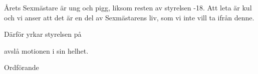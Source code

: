 \documentclass[../_main/handlingar.tex]{subfiles}
\begin{document}
\motionssvar
Årets Sexmästare är ung och pigg, liksom resten av styrelsen -18. Att leta är kul och vi anser att det är en del av Sexmästarens liv, som vi inte vill ta ifrån denne. 

Därför yrkar styrelsen på 
\begin{attsatser}
    \att avslå motionen i sin helhet.
\end{attsatser}

\begin{signatures}{1}
    \ist
    \signature{Daniel Bakic}{Ordförande}
\end{signatures}
\end{document}
